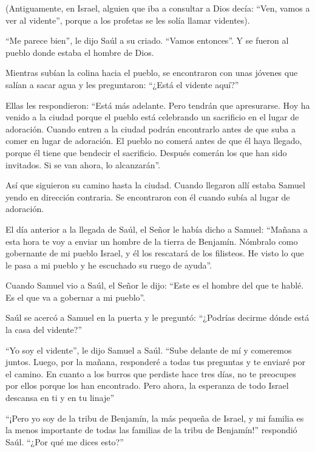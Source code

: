  (Antiguamente, en Israel, alguien que iba a consultar a
Dios decía: ``Ven, vamos a ver al vidente'', porque a los profetas se
les solía llamar videntes).

 ``Me parece bien'', le dijo Saúl a su criado. ``Vamos
entonces''. Y se fueron al pueblo donde estaba el hombre de Dios.

 Mientras subían la colina hacia el pueblo, se encontraron
con unas jóvenes que salían a sacar agua y les preguntaron: ``¿Está el
vidente aquí?''

 Ellas les respondieron: ``Está más adelante. Pero tendrán
que apresurarse. Hoy ha venido a la ciudad porque el pueblo está
celebrando un sacrificio en el lugar de adoración.  Cuando
entren a la ciudad podrán encontrarlo antes de que suba a comer en lugar
de adoración. El pueblo no comerá antes de que él haya llegado, porque
él tiene que bendecir el sacrificio. Después comerán los que han sido
invitados. Si se van ahora, lo alcanzarán''.

 Así que siguieron su camino hasta la ciudad. Cuando
llegaron allí estaba Samuel yendo en dirección contraria. Se encontraron
con él cuando subía al lugar de adoración.

 El día anterior a la llegada de Saúl, el Señor le había
dicho a Samuel:  ``Mañana a esta hora te voy a enviar un
hombre de la tierra de Benjamín. Nómbralo como gobernante de mi pueblo
Israel, y él los rescatará de los filisteos. He visto lo que le pasa a
mi pueblo y he escuchado su ruego de ayuda''.

 Cuando Samuel vio a Saúl, el Señor le dijo: ``Este es el
hombre del que te hablé. Es el que va a gobernar a mi pueblo''.

 Saúl se acercó a Samuel en la puerta y le preguntó:
``¿Podrías decirme dónde está la casa del vidente?''

 ``Yo soy el vidente'', le dijo Samuel a Saúl. ``Sube
delante de mí y comeremos juntos. Luego, por la mañana, responderé a
todas tus preguntas y te enviaré por el camino.  En cuanto
a los burros que perdiste hace tres días, no te preocupes por ellos
porque los han encontrado. Pero ahora, la esperanza de todo Israel
descansa en ti y en tu linaje''

 ``¡Pero yo soy de la tribu de Benjamín, la más pequeña de
Israel, y mi familia es la menos importante de todas las familias de la
tribu de Benjamín!'' respondió Saúl. ``¿Por qué me dices esto?''

